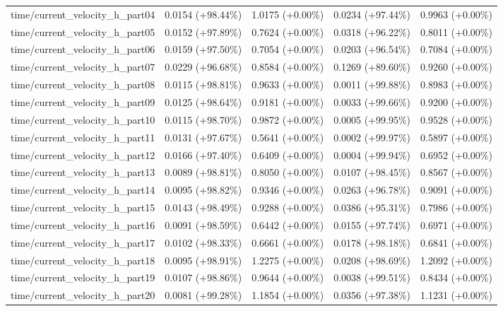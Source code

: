 \begin{table}[htbp]
{\begin{tabular}{lcccc}
time/current\_velocity\_h\_part04 & 0.0154 (+98.44\%) & 1.0175 (+0.00\%) & 0.0234 (+97.44\%) & 0.9963 (+0.00\%) \\
time/current\_velocity\_h\_part05 & 0.0152 (+97.89\%) & 0.7624 (+0.00\%) & 0.0318 (+96.22\%) & 0.8011 (+0.00\%) \\
time/current\_velocity\_h\_part06 & 0.0159 (+97.50\%) & 0.7054 (+0.00\%) & 0.0203 (+96.54\%) & 0.7084 (+0.00\%) \\
time/current\_velocity\_h\_part07 & 0.0229 (+96.68\%) & 0.8584 (+0.00\%) & 0.1269 (+89.60\%) & 0.9260 (+0.00\%) \\
time/current\_velocity\_h\_part08 & 0.0115 (+98.81\%) & 0.9633 (+0.00\%) & 0.0011 (+99.88\%) & 0.8983 (+0.00\%) \\
time/current\_velocity\_h\_part09 & 0.0125 (+98.64\%) & 0.9181 (+0.00\%) & 0.0033 (+99.66\%) & 0.9200 (+0.00\%) \\
time/current\_velocity\_h\_part10 & 0.0115 (+98.70\%) & 0.9872 (+0.00\%) & 0.0005 (+99.95\%) & 0.9528 (+0.00\%) \\
time/current\_velocity\_h\_part11 & 0.0131 (+97.67\%) & 0.5641 (+0.00\%) & 0.0002 (+99.97\%) & 0.5897 (+0.00\%) \\
time/current\_velocity\_h\_part12 & 0.0166 (+97.40\%) & 0.6409 (+0.00\%) & 0.0004 (+99.94\%) & 0.6952 (+0.00\%) \\
time/current\_velocity\_h\_part13 & 0.0089 (+98.81\%) & 0.8050 (+0.00\%) & 0.0107 (+98.45\%) & 0.8567 (+0.00\%) \\
time/current\_velocity\_h\_part14 & 0.0095 (+98.82\%) & 0.9346 (+0.00\%) & 0.0263 (+96.78\%) & 0.9091 (+0.00\%) \\
time/current\_velocity\_h\_part15 & 0.0143 (+98.49\%) & 0.9288 (+0.00\%) & 0.0386 (+95.31\%) & 0.7986 (+0.00\%) \\
time/current\_velocity\_h\_part16 & 0.0091 (+98.59\%) & 0.6442 (+0.00\%) & 0.0155 (+97.74\%) & 0.6971 (+0.00\%) \\
time/current\_velocity\_h\_part17 & 0.0102 (+98.33\%) & 0.6661 (+0.00\%) & 0.0178 (+98.18\%) & 0.6841 (+0.00\%) \\
time/current\_velocity\_h\_part18 & 0.0095 (+98.91\%) & 1.2275 (+0.00\%) & 0.0208 (+98.69\%) & 1.2092 (+0.00\%) \\
time/current\_velocity\_h\_part19 & 0.0107 (+98.86\%) & 0.9644 (+0.00\%) & 0.0038 (+99.51\%) & 0.8434 (+0.00\%) \\
time/current\_velocity\_h\_part20 & 0.0081 (+99.28\%) & 1.1854 (+0.00\%) & 0.0356 (+97.38\%) & 1.1231 (+0.00\%) \\

\end{tabular}}
\end{table}
